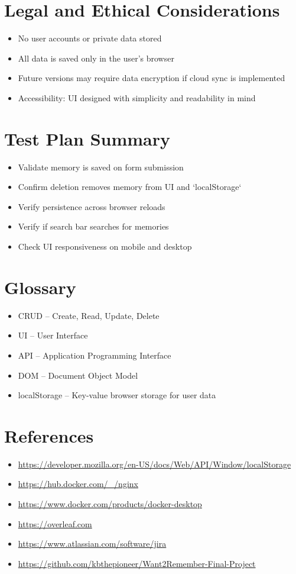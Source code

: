 \documentclass[12pt]{article}
\begin{document}
\section{Legal and Ethical Considerations}
\begin{itemize}
    \item No user accounts or private data stored
    \item All data is saved only in the user's browser
    \item Future versions may require data encryption if cloud sync is implemented
    \item Accessibility: UI designed with simplicity and readability in mind
\end{itemize}

\section{Test Plan Summary}
\begin{itemize}
    \item Validate memory is saved on form submission
    \item Confirm deletion removes memory from UI and `localStorage`
    \item Verify persistence across browser reloads
    \item Verify if search bar searches for memories
    \item Check UI responsiveness on mobile and desktop
\end{itemize}

\section{Glossary}
\begin{itemize}
    \item CRUD – Create, Read, Update, Delete
    \item UI – User Interface
    \item API – Application Programming Interface
    \item DOM – Document Object Model
    \item localStorage – Key-value browser storage for user data
\end{itemize}

\section{References}
\begin{itemize}
  \item \url{https://developer.mozilla.org/en-US/docs/Web/API/Window/localStorage}
  \item \url{https://hub.docker.com/_/nginx}
  \item \url{https://www.docker.com/products/docker-desktop}
  \item \url{https://overleaf.com}
  \item \url{https://www.atlassian.com/software/jira}
  \item \url{https://github.com/kbthepioneer/Want2Remember-Final-Project}
\end{itemize}
\end{document}
